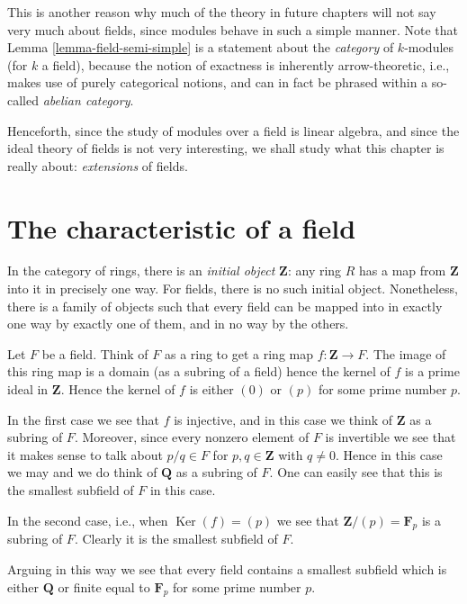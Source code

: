 \documentclass{stacks-project}
\theoremstyle{plain}
\theoremstyle{definition}
\theoremstyle{remark}
\numberwithin{equation}{subsection}
\def\Ker{\mathop{\mathrm{Ker}}}
\begin{document}
\noindent
This is another reason why much of the theory in future chapters will not say
very much about fields, since modules behave in such a simple manner.
Note that Lemma \ref{lemma-field-semi-simple} is a statement about the
{\it category} of $k$-modules (for $k$ a field), because the notion of
exactness is inherently arrow-theoretic, i.e., makes use of purely categorical
notions, and can in fact be phrased within a so-called {\it abelian category}.

\medskip\noindent
Henceforth, since the study of modules over a field is linear algebra, and
since the ideal theory of fields is not very interesting, we shall study what
this chapter is really about: {\it extensions} of fields.


\section{The characteristic of a field}
\label{section-more-fields}

\noindent
In the category of rings, there is an {\it initial object} $\mathbf{Z}$: any
ring $R$ has a map from $\mathbf{Z}$ into it in precisely one way. For fields,
there is no such initial object.
Nonetheless, there is a family of objects such that every field can be mapped
into in exactly one way by exactly one of them, and in no way by the others.

\medskip\noindent
Let $F$ be a field. Think of $F$ as a ring to get a ring map
$f : \mathbf{Z} \to F$. The image of this ring map is a domain
(as a subring of a field) hence the kernel of $f$ is a prime ideal
in $\mathbf{Z}$. Hence the kernel of $f$ is either $(0)$ or $(p)$ for
some prime number $p$.

\medskip\noindent
In the first case we see that $f$ is injective, and in this case
we think of $\mathbf{Z}$ as a subring of $F$. Moreover, since every
nonzero element of $F$ is invertible we see that it makes sense to
talk about $p/q \in F$ for $p, q \in \mathbf{Z}$ with $q \not = 0$.
Hence in this case we may and we do think of $\mathbf{Q}$ as a subring of $F$.
One can easily see that this is the smallest subfield of $F$ in this case.

\medskip\noindent
In the second case, i.e., when $\Ker(f) = (p)$ we see that
$\mathbf{Z}/(p) = \mathbf{F}_p$ is a subring of $F$. Clearly it is the
smallest subfield of $F$.

\medskip\noindent
Arguing in this way we see that every field contains a smallest subfield
which is either $\mathbf{Q}$ or finite equal to $\mathbf{F}_p$ for some
prime number $p$.
\end{document}
